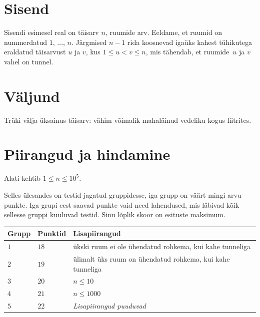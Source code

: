 \section*{Sisend}

Sisendi esimesel real on täisarv $n$, ruumide arv.
Eeldame, et ruumid on nummerdatud $1$, $\ldots$, $n$.
Järgmised $n-1$ rida koosnevad igaüks kahest tühikutega eraldatud täisarvust $u$ ja $v$,
kus $1\leq u < v \leq n$, %
mis tähendab, et ruumide~$u$ ja $v$ vahel on tunnel.

\section*{Väljund}

Trüki välja üksainus täisarv: vähim võimalik mahaläinud vedeliku kogus liitrites.

\section*{Piirangud ja hindamine}

Alati kehtib
$1\leq n\leq 10^5$. %

Selles ülesandes on testid jagatud gruppidesse, iga grupp on väärt mingi arvu punkte.
Iga grupi eest saavad punkte vaid need lahendused, mis läbivad kõik sellesse gruppi kuuluvad testid.
Sinu lõplik skoor on esituste maksimum.

\medskip
\begin{tabular}{lll}
Grupp & Punktid & Lisapiirangud \\\hline
  $1$ & $18$ & ükski ruum ei ole ühendatud rohkema, kui kahe tunneliga\\
  $2$ & $19$ & ülimalt üks ruum on ühendatud rohkema, kui kahe tunneliga\\
  $3$ & $20$ & $n\leq 10$\\
  $4$ & $21$ & $n\leq 1000$\\
  $5$ & $22$ & \emph{Lisapiirangud puuduvad}
\end{tabular}

